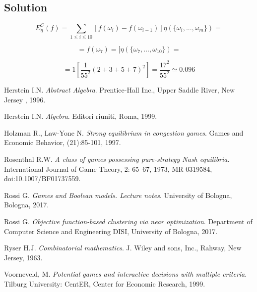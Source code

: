 \documentclass{article}
\begin{document}
\subsection{Solution}
\[ E_{\eta}^C(f) = \sum_{1 \le i \le 10}[f(\omega_i)-f(\omega_{i-1})] \eta (\{\omega_i, ..., \omega_m\}) = \]

\[ = f(\omega_7) = [\eta (\{\omega_7, \ldots, \omega_{10}\}) = \]

\[ = 1[\frac{1}{55^2}(2+3+5+7)^2] = \frac{17^2}{55^2} \simeq 0.096 \]
\medskip
 

\begin{thebibliography}{9}
Herstein I.N.
\textit{Abstract Algebra}. 
Prentice-Hall Inc., Upper Saddle River, New Jersey , 1996.

Herstein I.N.
\textit{Algebra}. 
Editori riuniti, Roma, 1999.

Holzman R., Law-Yone N.
\textit{Strong equilibrium in congestion games}.
Games and Economic Behavior, (21):85-101, 1997.

Rosenthal R.W.
\textit{A class of games possessing pure-strategy Nash equilibria}.
International Journal of Game Theory, 2: 65–67, 1973, MR 0319584, doi:10.1007/BF01737559.

Rossi G.
\textit{Games and Boolean models. Lecture notes}.
University of Bologna, Bologna, 2017.

Rossi G.
\textit{Objective function-based clustering via near optimization}.
Department of Computer Science and Engineering DISI, University of Bologna, 2017.

Ryser H.J.
\textit{Combinatorial mathematics}.
J. Wiley and sons, Inc., Rahway, New Jersey, 1963.


Voorneveld, M. 
\textit{Potential games and interactive decisions with multiple criteria}.
Tilburg University: CentER, Center for Economic Research, 1999.

 

\end{thebibliography}
\end{document}
